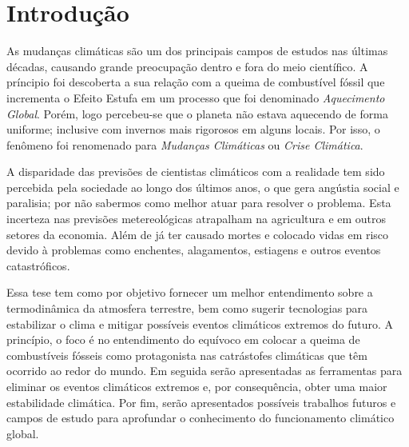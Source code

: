 \chapter*[Introdução]{Introdução}

As mudanças climáticas são um dos principais campos de estudos nas últimas décadas, causando grande preocupação dentro e fora do meio científico. A príncipio foi descoberta a sua relação com a queima de combustível fóssil que incrementa o Efeito Estufa em um processo que foi denominado \textit{Aquecimento Global}. Porém, logo percebeu-se que o planeta não estava aquecendo de forma uniforme; inclusive com invernos mais rigorosos em alguns locais. Por isso, o fenômeno foi renomenado para \textit{Mudanças Climáticas} ou \textit{Crise Climática}.

A disparidade das previsões de cientistas climáticos com a realidade tem sido percebida pela sociedade ao longo dos últimos anos, o que gera angústia social e paralisia; por não sabermos como melhor atuar para resolver o problema. Esta incerteza nas previsões metereológicas atrapalham na agricultura e em outros setores da economia. Além de já ter causado mortes e colocado vidas em risco devido à problemas como enchentes, alagamentos, estiagens e outros eventos catastróficos. 

Essa tese tem como por objetivo fornecer um melhor entendimento sobre a termodinâmica da atmosfera terrestre, bem como sugerir tecnologias para estabilizar o clima e mitigar possíveis eventos climáticos extremos do futuro. A princípio, o foco é no entendimento do equívoco em colocar a queima de combustíveis fósseis como protagonista nas catrástofes climáticas que têm ocorrido ao redor do mundo. Em seguida serão apresentadas as ferramentas para eliminar os eventos climáticos extremos e, por consequência, obter uma maior estabilidade climática. Por fim, serão apresentados possíveis trabalhos futuros e campos de estudo para aprofundar o conhecimento do funcionamento climático global.